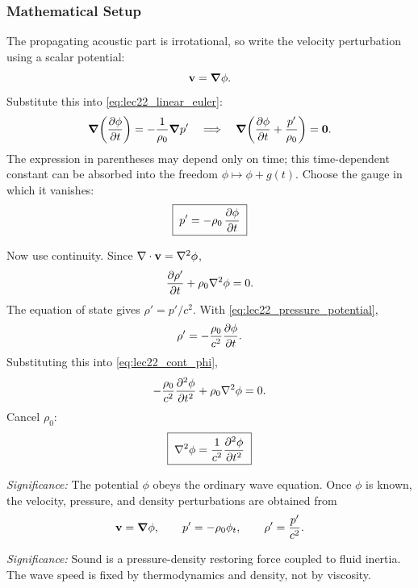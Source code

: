 \documentclass[../main.tex]{subfiles}
\begin{document}
\subsubsection*{Mathematical Setup}
The propagating acoustic part is irrotational, so write the velocity perturbation
using a scalar potential:
\begin{equation}
  \mathbf{v}=\grad\phi.
  \label{eq:lec22_velocity_potential}
\end{equation}
Substitute this into \eqref{eq:lec22_linear_euler}:
\[
  \grad\!\left(\pdv{\phi}{t}\right)=-\frac{1}{\rho_0}\grad p'
  \quad\Longrightarrow\quad
  \grad\!\left(\pdv{\phi}{t}+\frac{p'}{\rho_0}\right)=\mathbf{0}.
\]
The expression in parentheses may depend only on time; this time-dependent
constant can be absorbed into the freedom $\phi\mapsto\phi+g(t)$. Choose the
gauge in which it vanishes:
\begin{equation}
  \boxed{\;p'=-\rho_0\,\pdv{\phi}{t}\;}
  \label{eq:lec22_pressure_potential}
\end{equation}

Now use continuity. Since $\nabla \cdot\mathbf{v}=\nabla^2\phi$,
\begin{equation}
  \pdv{\rho'}{t}+\rho_0\nabla^2\phi=0.
  \label{eq:lec22_cont_phi}
\end{equation}
The equation of state gives $\rho'=p'/c^2$. With
\eqref{eq:lec22_pressure_potential},
\[
  \rho'=-\frac{\rho_0}{c^2}\pdv{\phi}{t}.
\]
Substituting this into \eqref{eq:lec22_cont_phi},
\[
  -\frac{\rho_0}{c^2}\pdv[2]{\phi}{t}+\rho_0\nabla^2\phi=0.
\]
Cancel $\rho_0$:
\begin{equation}
  \boxed{\;\nabla^2\phi=\frac{1}{c^2}\pdv[2]{\phi}{t}\;}
  \label{eq:lec22_wave_phi}
\end{equation}

\textit{Significance:} The potential $\phi$ obeys the ordinary wave equation.
Once $\phi$ is known, the velocity, pressure, and density perturbations are
obtained from
\[
  \mathbf{v}=\grad\phi,\qquad p'=-\rho_0\phi_t,\qquad \rho'=\frac{p'}{c^2}.
\]

\textit{Significance:} Sound is a pressure-density restoring force coupled to
fluid inertia. The wave speed is fixed by thermodynamics and density, not by
viscosity.
\end{document}
